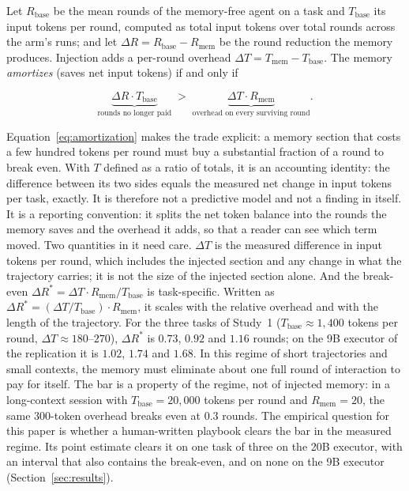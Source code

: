 \documentclass[smallcondensed,natbib]{svjour3}
\begin{document}
Let $R_{\mathrm{base}}$ be the mean rounds of the memory-free agent on
a task and $T_{\mathrm{base}}$ its input tokens per round, computed as
total input tokens over total rounds across the arm's runs; and
let $\Delta R = R_{\mathrm{base}} - R_{\mathrm{mem}}$ be the round
reduction the memory produces. Injection adds a per-round overhead
$\Delta T = T_{\mathrm{mem}} - T_{\mathrm{base}}$. The memory
\emph{amortizes} (saves net input tokens) if and only if

\begin{equation}\label{eq:amortization}
\underbrace{\Delta R \cdot T_{\mathrm{base}}}_{\text{rounds no longer
paid}} \;>\; \underbrace{\Delta T \cdot
R_{\mathrm{mem}}}_{\text{overhead on every surviving round}} .
\end{equation}

Equation~\eqref{eq:amortization} makes the trade explicit: a memory
section that costs a few hundred tokens per round must buy a
substantial fraction of a round to break even. With $T$ defined as a
ratio of totals, it is an accounting identity: the difference between
its two sides equals the measured net change in input tokens per task,
exactly. It is therefore not a predictive model and not a finding in
itself. It is a reporting convention: it splits the net token balance
into the rounds the memory saves and the overhead it adds, so that a
reader can see which term moved. Two quantities in it need care.
$\Delta T$ is the measured difference in input tokens per round, which
includes the injected section and any change in what the trajectory
carries; it is not the size of the injected section alone. And the
break-even $\Delta R^{*} = \Delta T \cdot R_{\mathrm{mem}} /
T_{\mathrm{base}}$ is task-specific. Written as $\Delta R^{*} =
(\Delta T / T_{\mathrm{base}}) \cdot R_{\mathrm{mem}}$, it scales with
the relative overhead and with the length of the trajectory. For the
three tasks of Study~1 ($T_{\mathrm{base}} \approx 1{,}400$ tokens per
round, $\Delta T \approx 180$--$270$), $\Delta R^{*}$ is $0.73$,
$0.92$ and $1.16$ rounds; on the 9B executor of the replication it is
$1.02$, $1.74$ and $1.68$. In this regime of short trajectories and
small contexts, the memory must eliminate about one full round of
interaction to pay for itself. The bar is a property of the regime,
not of injected memory: in a long-context session with
$T_{\mathrm{base}} = 20{,}000$ tokens per round and $R_{\mathrm{mem}}
= 20$, the same 300-token overhead breaks even at $0.3$ rounds. The
empirical question for this paper is whether a human-written playbook
clears the bar in the measured regime. Its point estimate clears it on
one task of three on the 20B executor, with an interval that also
contains the break-even, and on none on the 9B executor
(Section~\ref{sec:results}).
\end{document}
